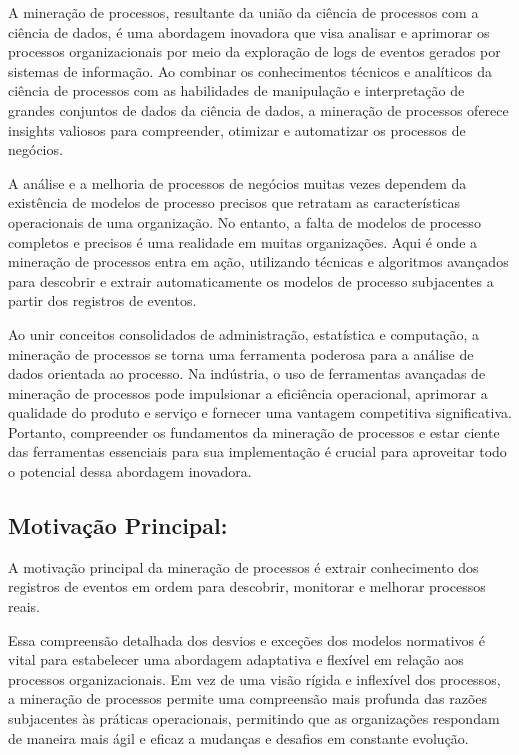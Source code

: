 \documentclass[tcc2]{classe_uftex/uftex}
\begin{document}
A mineração de processos, resultante da união da ciência de processos com a ciência de dados, é uma abordagem inovadora que visa analisar e aprimorar os processos organizacionais por meio da exploração de logs de eventos gerados por sistemas de informação.\cite{van2012process}
Ao combinar os conhecimentos técnicos e analíticos da ciência de processos com as habilidades de manipulação e interpretação de grandes conjuntos de dados da ciência de dados, a mineração de processos oferece insights valiosos para compreender, otimizar e automatizar os processos de negócios.

A análise e a melhoria de processos de negócios muitas vezes dependem da existência de modelos de processo precisos que retratam as características operacionais de uma organização. No entanto, a falta de modelos de processo completos e precisos é uma realidade em muitas organizações. Aqui é onde a mineração de processos entra em ação, utilizando técnicas e algoritmos avançados para descobrir e extrair automaticamente os modelos de processo subjacentes a partir dos registros de eventos.

Ao unir conceitos consolidados de administração, estatística e computação, a mineração de processos se torna uma ferramenta poderosa para a análise de dados orientada ao processo. Na indústria, o uso de ferramentas avançadas de mineração de processos pode impulsionar a eficiência operacional, aprimorar a qualidade do produto e serviço e fornecer uma vantagem competitiva significativa. Portanto, compreender os fundamentos da mineração de processos e estar ciente das ferramentas essenciais para sua implementação é crucial para aproveitar todo o potencial dessa abordagem inovadora.

\subsection{Motivação Principal:}

A motivação principal da mineração de processos é extrair conhecimento dos registros de eventos em ordem para descobrir, monitorar e melhorar processos reais.\cite{van2012process}

Essa compreensão detalhada dos desvios e exceções dos modelos normativos é vital para estabelecer uma abordagem adaptativa e flexível em relação aos processos organizacionais. Em vez de uma visão rígida e inflexível dos processos, a mineração de processos permite uma compreensão mais profunda das razões subjacentes às práticas operacionais, permitindo que as organizações respondam de maneira mais ágil e eficaz a mudanças e desafios em constante evolução.
\end{document}
